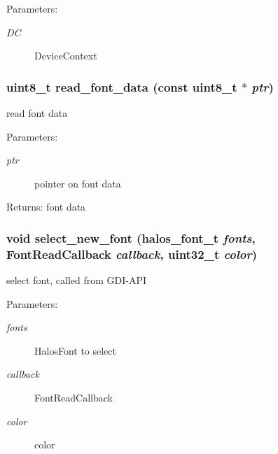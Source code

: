 \begin{Desc}
\item[Parameters:]
\begin{description}
\item[{\em DC}]DeviceContext \end{description}
\end{Desc}
\hypertarget{group__graphic__device__font_g56c9e56353b4b51cda195a17a23748ea}{
\subsubsection[{read\_\-font\_\-data}]{\setlength{\rightskip}{0pt plus 5cm}uint8\_\-t read\_\-font\_\-data (const uint8\_\-t $\ast$ {\em ptr})}}
\label{group__graphic__device__font_g56c9e56353b4b51cda195a17a23748ea}


read font data 

\begin{Desc}
\item[Parameters:]
\begin{description}
\item[{\em ptr}]pointer on font data \end{description}
\end{Desc}
\begin{Desc}
\item[Returns:]font data \end{Desc}
\hypertarget{group__graphic__device__font_g65f96d48c2f92aac9b7b71208826bdaf}{
\subsubsection[{select\_\-new\_\-font}]{\setlength{\rightskip}{0pt plus 5cm}void select\_\-new\_\-font ({\bf halos\_\-font\_\-t} {\em fonts}, \/  {\bf FontReadCallback} {\em callback}, \/  uint32\_\-t {\em color})}}
\label{group__graphic__device__font_g65f96d48c2f92aac9b7b71208826bdaf}


select font, called from GDI-API 

\begin{Desc}
\item[Parameters:]
\begin{description}
\item[{\em fonts}]HalosFont to select \item[{\em callback}]FontReadCallback \item[{\em color}]color \end{description}
\end{Desc}
